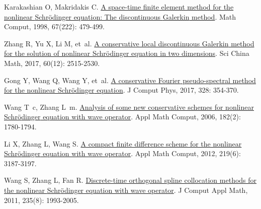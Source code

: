 \begin{thebibliography}{79}
    Karakashian O, Makridakis C.
    \newblock \href{https://www.ams.org/mcom/1998-67-222/S0025-5718-98-00946-6/}{A space-time finite element method for the nonlinear {{Schr{\"o}dinger}} equation: The discontinuous {{Galerkin}} method}\allowbreak[J].
    \newblock Math Comput, 1998, 67\allowbreak (222): 479-499.
    
    Zhang R, Yu X, Li M, et~al.
    \newblock \href{https://doi.org/10.1007/s11425-016-9118-x}{A conservative local discontinuous {{Galerkin}} method for the solution of nonlinear {{Schr{\"o}dinger}} equation in two dimensions}\allowbreak[J].
    \newblock Sci China Math, 2017, 60\allowbreak (12): 2515-2530.
    
    Gong Y, Wang Q, Wang Y, et~al.
    \newblock \href{https://www.sciencedirect.com/science/article/pii/S0021999116305204}{A conservative {{Fourier}} pseudo-spectral method for the nonlinear {{Schr{\"o}dinger}} equation}\allowbreak[J].
    \newblock J Comput Phys, 2017, 328: 354-370.
    
    Wang T~c, Zhang L~m.
    \newblock \href{https://linkinghub.elsevier.com/retrieve/pii/S009630030600525X}{Analysis of some new conservative schemes for nonlinear {{Schr{\"o}dinger}} equation with wave operator}\allowbreak[J].
    \newblock Appl Math Comput, 2006, 182\allowbreak (2): 1780-1794.
    
    Li X, Zhang L, Wang S.
    \newblock \href{https://linkinghub.elsevier.com/retrieve/pii/S0096300312009502}{A compact finite difference scheme for the nonlinear {{Schr{\"o}dinger}} equation with wave operator}\allowbreak[J].
    \newblock Appl Math Comput, 2012, 219\allowbreak (6): 3187-3197.
    
    Wang S, Zhang L, Fan R.
    \newblock \href{https://linkinghub.elsevier.com/retrieve/pii/S0377042710005510}{Discrete-time orthogonal spline collocation methods for the nonlinear {{Schr{\"o}dinger}} equation with wave operator}\allowbreak[J].
    \newblock J Comput Appl Math, 2011, 235\allowbreak (8): 1993-2005.
    

\end{thebibliography}
